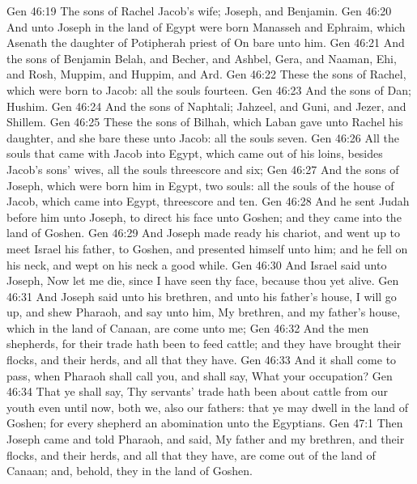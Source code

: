 \vs Gen 46:19 The sons of Rachel Jacob's wife; Joseph, and Benjamin.
\vs Gen 46:20 And unto Joseph in the land of Egypt were born Manasseh and Ephraim, which Asenath the daughter of Potipherah priest of On bare unto him.
\vs Gen 46:21 And the sons of Benjamin  Belah, and Becher, and Ashbel, Gera, and Naaman, Ehi, and Rosh, Muppim, and Huppim, and Ard.
\vs Gen 46:22 These  the sons of Rachel, which were born to Jacob: all the souls  fourteen.
\vs Gen 46:23 And the sons of Dan; Hushim.
\vs Gen 46:24 And the sons of Naphtali; Jahzeel, and Guni, and Jezer, and Shillem.
\vs Gen 46:25 These  the sons of Bilhah, which Laban gave unto Rachel his daughter, and she bare these unto Jacob: all the souls  seven.
\vs Gen 46:26 All the souls that came with Jacob into Egypt, which came out of his loins, besides Jacob's sons' wives, all the souls  threescore and six;
\vs Gen 46:27 And the sons of Joseph, which were born him in Egypt,  two souls: all the souls of the house of Jacob, which came into Egypt,  threescore and ten.
\vs Gen 46:28 And he sent Judah before him unto Joseph, to direct his face unto Goshen; and they came into the land of Goshen.
\vs Gen 46:29 And Joseph made ready his chariot, and went up to meet Israel his father, to Goshen, and presented himself unto him; and he fell on his neck, and wept on his neck a good while.
\vs Gen 46:30 And Israel said unto Joseph, Now let me die, since I have seen thy face, because thou  yet alive.
\vs Gen 46:31 And Joseph said unto his brethren, and unto his father's house, I will go up, and shew Pharaoh, and say unto him, My brethren, and my father's house, which  in the land of Canaan, are come unto me;
\vs Gen 46:32 And the men  shepherds, for their trade hath been to feed cattle; and they have brought their flocks, and their herds, and all that they have.
\vs Gen 46:33 And it shall come to pass, when Pharaoh shall call you, and shall say, What  your occupation?
\vs Gen 46:34 That ye shall say, Thy servants' trade hath been about cattle from our youth even until now, both we,  also our fathers: that ye may dwell in the land of Goshen; for every shepherd  an abomination unto the Egyptians.
\vs Gen 47:1 Then Joseph came and told Pharaoh, and said, My father and my brethren, and their flocks, and their herds, and all that they have, are come out of the land of Canaan; and, behold, they  in the land of Goshen.
